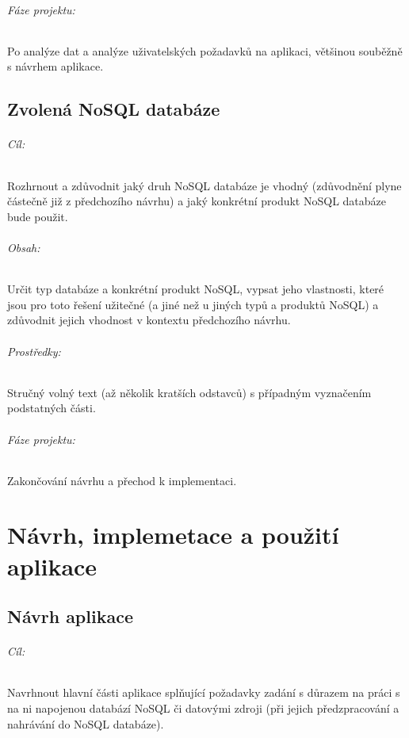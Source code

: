 \documentclass[10pt,xcolor=pdflatex,dvipsnames,table,oneside]{book}
\begin{document}
\paragraph{Fáze projektu:}
Po analýze dat a analýze uživatelských požadavků na aplikaci, většinou souběžně s návrhem aplikace.

\chapter{Zvolená NoSQL databáze}

\paragraph{Cíl:}
Rozhrnout a zdůvodnit jaký druh NoSQL databáze je vhodný (zdůvodnění plyne částečně již z předchozího návrhu) a jaký konkrétní produkt NoSQL databáze bude použit.

\paragraph{Obsah:}
Určit typ databáze a konkrétní produkt NoSQL, vypsat jeho vlastnosti,
které jsou pro toto řešení užitečné (a jiné než u jiných typů a produktů NoSQL)
a zdůvodnit jejich vhodnost v kontextu předchozího návrhu.

\paragraph{Prostředky:}
Stručný volný text (až několik kratších odstavců) s případným vyznačením podstatných části.

\paragraph{Fáze projektu:}
Zakončování návrhu a přechod k implementaci.

\part{Návrh, implemetace a použití aplikace}

\chapter{Návrh aplikace}
\iffalse
\paragraph{Cíl:}
Navrhnout hlavní části aplikace splňující požadavky zadání s důrazem na práci s na ni napojenou databází NoSQL či datovými zdroji
(při jejich předzpracování a nahrávání do NoSQL databáze).
\end{document}
